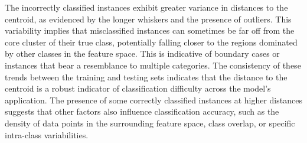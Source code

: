The incorrectly classified instances exhibit greater variance in distances to the centroid, as evidenced by the longer whiskers and the presence of outliers. This variability implies that misclassified instances can sometimes be far off from the core cluster of their true class, potentially falling closer to the regions dominated by other classes in the feature space. This is indicative of boundary cases or instances that bear a resemblance to multiple categories. The consistency of these trends between the training and testing sets indicates that the distance to the centroid is a robust indicator of classification difficulty across the model's application. The presence of some correctly classified instances at higher distances suggests that other factors also influence classification accuracy, such as the density of data points in the surrounding feature space, class overlap, or specific intra-class variabilities.




